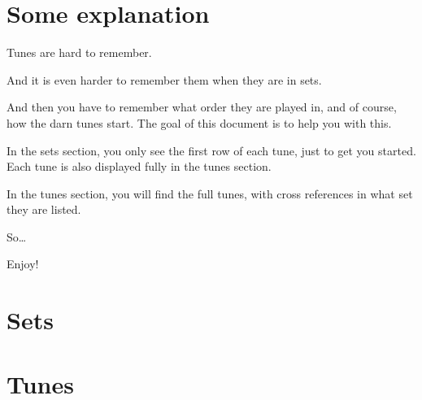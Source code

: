 \documentclass[10pt]{book}
\begin{document}

\setcounter{tocdepth}{3}
\tableofcontents
{}
\clearpage

\setcounter{page}{1}
\chapter*{Some explanation}
Tunes are hard to remember.

And it is even harder to remember them when they are in sets.

And then you have to remember what order they are played in, and of course, how the darn tunes start. The goal of this document is to help you with this.

In the sets section, you only see the first row of each tune, just to get you started. Each tune is also displayed fully in the tunes section.

In the tunes section, you will find the full tunes, with cross references in what set they are listed.

So\ldots

Enjoy!

\chapter{Sets}

\clearpage

\clearpage

\clearpage
\chapter{Tunes}

\clearpage

\clearpage

\clearpage

\printindex
\end{document}
